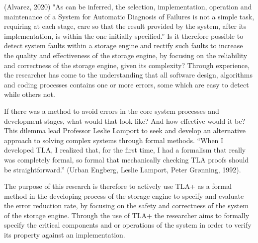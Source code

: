 \documentclass[11pt,a4paper,oneside]{book} %
\numberwithin{equation}{section}
\begin{document}
(Alvarez, 2020) "As can be inferred, the selection, implementation, operation and
maintenance of a System for Automatic Diagnosis of Failures is not a simple task, requiring at
each stage, care so that the result provided by the system, after its implementation, is within
the one initially specified.” Is it therefore possible to detect system faults within a storage
engine and rectify such faults to increase the quality and effectiveness of the storage engine,
by focusing on the reliability and correctness of the storage engine, given its complexity?
Through experience, the researcher has come to the understanding that all software design, algorithms and
coding processes contains one or more errors, some which are easy to detect while others not.

\setlength{\parskip}{10pt}

If there was a method to avoid errors in the core system processes and development stages,
what would that look like? And how effective would it be? This dilemma lead Professor Leslie
Lamport to seek and develop an alternative approach to solving complex systems through
formal methods. “When I developed TLA, I realized that, for the first time, I had a formalism
that really was completely formal, so formal that mechanically checking TLA proofs should be
straightforward.” (Urban Engberg, Leslie Lamport, Peter Grønning, 1992).

\setlength{\parskip}{10pt}

The purpose of this research is therefore to actively use TLA+ as a formal method in the
developing process of the storage engine to specify and evaluate the error reduction rate, by
focusing on the safety and correctness of the system of the storage engine. Through the use
of TLA+ the researcher aims to formally specify the critical components and or operations of
the system in order to verify its property against an implementation.
\end{document}
